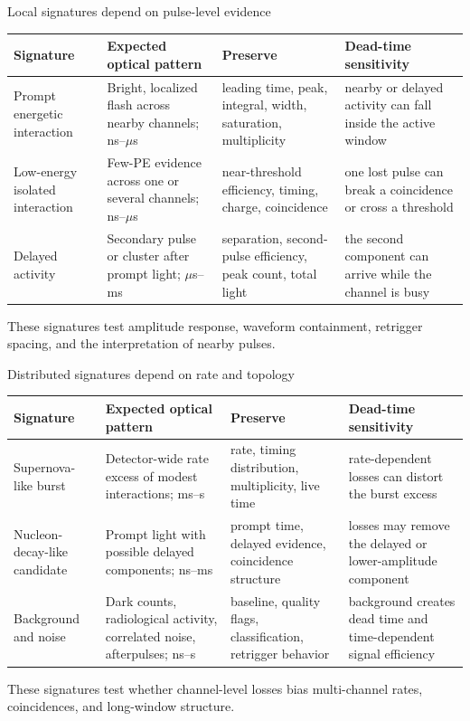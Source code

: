 \documentclass[aspectratio=169,11pt]{beamer}
\begin{document}
\begin{frame}{Local signatures depend on pulse-level evidence}
  \footnotesize
  \setlength{\tabcolsep}{2pt}
  \renewcommand{\arraystretch}{1.22}
  \begin{tabular}{@{}p{}p{}p{}p{}@{}}
    \toprule
    Signature & Expected optical pattern & Preserve & Dead-time sensitivity \\
    \midrule
    Prompt energetic interaction & Bright, localized flash across nearby channels; ns--\(\mu\)s & leading time, peak, integral, width, saturation, multiplicity & nearby or delayed activity can fall inside the active window \\
    Low-energy isolated interaction & Few-PE evidence across one or several channels; ns--\(\mu\)s & near-threshold efficiency, timing, charge, coincidence & one lost pulse can break a coincidence or cross a threshold \\
    Delayed activity & Secondary pulse or cluster after prompt light; \(\mu\)s--ms & separation, second-pulse efficiency, peak count, total light & the second component can arrive while the channel is busy \\
    \bottomrule
  \end{tabular}

  \medskip
    {These signatures test amplitude response, waveform containment, retrigger spacing, and the interpretation of nearby pulses.}
\end{frame}

\begin{frame}{Distributed signatures depend on rate and topology}
  \footnotesize
  \setlength{\tabcolsep}{2pt}
  \renewcommand{\arraystretch}{1.22}
  \begin{tabular}{@{}p{}p{}p{}p{}@{}}
    \toprule
    Signature & Expected optical pattern & Preserve & Dead-time sensitivity \\
    \midrule
    Supernova-like burst & Detector-wide rate excess of modest interactions; ms--s & rate, timing distribution, multiplicity, live time & rate-dependent losses can distort the burst excess \\
    Nucleon-decay-like candidate & Prompt light with possible delayed components; ns--ms & prompt time, delayed evidence, coincidence structure & losses may remove the delayed or lower-amplitude component \\
    Background and noise & Dark counts, radiological activity, correlated noise, afterpulses; ns--s & baseline, quality flags, classification, retrigger behavior & background creates dead time and time-dependent signal efficiency \\
    \bottomrule
  \end{tabular}

  \medskip
    {These signatures test whether channel-level losses bias multi-channel rates, coincidences, and long-window structure.}
\end{frame}
\end{document}
